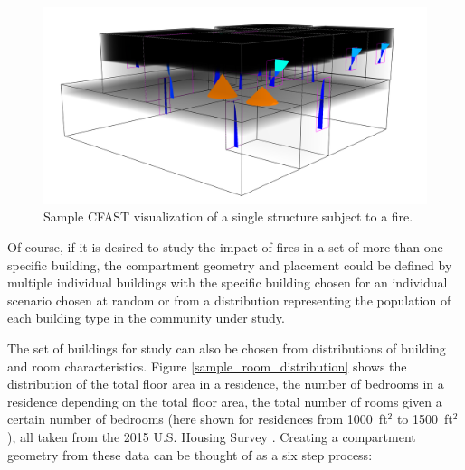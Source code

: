 \documentclass[12pt,twoside]{book}
\begin{document}
\begin{figure}[h!]
\includegraphics[width=6.5in]{FIGURES/Sample_Visualization.png}
\caption{Sample CFAST visualization of a single structure subject to a fire.}
\label{sample_visualization}
\end{figure}

Of course, if it is desired to study the impact of fires in a set of more than one specific building, the compartment geometry and placement could be defined by multiple individual buildings with the specific building chosen for an individual scenario chosen at random or from a distribution representing the population of each building type in the community under study.

The set of buildings for study can also be chosen from distributions of building and room characteristics. Figure \ref{sample_room_distribution} shows the distribution of the total floor area in a residence, the number of bedrooms in a residence depending on the total floor area, the total number of rooms given a certain number of bedrooms (here shown for residences from 1000~ft$^2$ to 1500~ft$^2$), all taken from the 2015 U.S. Housing Survey \cite{AHS2015}. Creating a compartment geometry from these data can be thought of as a six step process:
\end{document}
